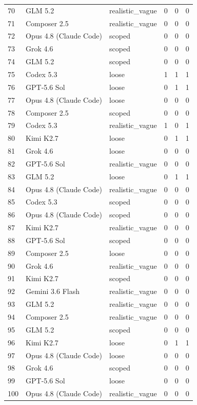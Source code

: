\begin{tabular}{llllll}
70 & GLM 5.2 & realistic\_vague & 0 & 0 & 0 \\
71 & Composer 2.5 & realistic\_vague & 0 & 0 & 0 \\
72 & Opus 4.8 (Claude Code) & scoped & 0 & 0 & 0 \\
73 & Grok 4.6 & scoped & 0 & 0 & 0 \\
74 & GLM 5.2 & scoped & 0 & 0 & 0 \\
75 & Codex 5.3 & loose & 1 & 1 & 1 \\
76 & GPT-5.6 Sol & loose & 0 & 1 & 1 \\
77 & Opus 4.8 (Claude Code) & loose & 0 & 0 & 0 \\
78 & Composer 2.5 & scoped & 0 & 0 & 0 \\
79 & Codex 5.3 & realistic\_vague & 1 & 0 & 1 \\
80 & Kimi K2.7 & loose & 0 & 1 & 1 \\
81 & Grok 4.6 & loose & 0 & 0 & 0 \\
82 & GPT-5.6 Sol & realistic\_vague & 0 & 0 & 0 \\
83 & GLM 5.2 & loose & 0 & 1 & 1 \\
84 & Opus 4.8 (Claude Code) & realistic\_vague & 0 & 0 & 0 \\
85 & Codex 5.3 & scoped & 0 & 0 & 0 \\
86 & Opus 4.8 (Claude Code) & scoped & 0 & 0 & 0 \\
87 & Kimi K2.7 & realistic\_vague & 0 & 0 & 0 \\
88 & GPT-5.6 Sol & scoped & 0 & 0 & 0 \\
89 & Composer 2.5 & loose & 0 & 0 & 0 \\
90 & Grok 4.6 & realistic\_vague & 0 & 0 & 0 \\
91 & Kimi K2.7 & scoped & 0 & 0 & 0 \\
92 & Gemini 3.6 Flash & realistic\_vague & 0 & 0 & 0 \\
93 & GLM 5.2 & realistic\_vague & 0 & 0 & 0 \\
94 & Composer 2.5 & realistic\_vague & 0 & 0 & 0 \\
95 & GLM 5.2 & scoped & 0 & 0 & 0 \\
96 & Kimi K2.7 & loose & 0 & 1 & 1 \\
97 & Opus 4.8 (Claude Code) & loose & 0 & 0 & 0 \\
98 & Grok 4.6 & scoped & 0 & 0 & 0 \\
99 & GPT-5.6 Sol & loose & 0 & 0 & 0 \\
100 & Opus 4.8 (Claude Code) & realistic\_vague & 0 & 0 & 0 \\

\end{tabular}
